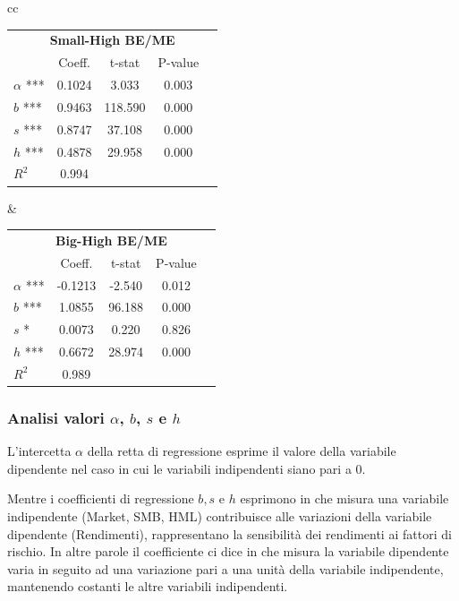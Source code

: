 \begin{center}
\begin{tabular}{cc}
	
	 \begin{tabular}{lcccc}
		\toprule
		
		\multicolumn{5}{c}{\textbf{Small-High BE/ME} }\\
		& Coeff. & t-stat & P-value &\\
		$\alpha$ ***& 	0.1024	& 3.033 & 0.003 &\\
		$b$ ***& 0.9463 & 118.590& 0.000 &\\
		$s$ ***& 0.8747& 37.108 & 0.000 &\\
		$h$ ***&  0.4878& 29.958 & 0.000 & \\
		
		$R^2$ & 0.994 & & & \\
		\hline			
	\end{tabular}
 & \begin{tabular}{lcccc}
	\toprule
	
	\multicolumn{5}{c}{\textbf{Big-High BE/ME} }\\
	& Coeff. & t-stat & P-value &\\
	$\alpha$ *** & 	-0.1213	&-2.540 & 0.012 &\\
	$b$ ***& 1.0855 & 96.188& 0.000 &\\
	$s$ *& 0.0073& 0.220 & 0.826 &\\
	$h$ ***&  0.6672& 28.974 & 0.000 & \\
	
	$R^2$ & 0.989 & & & \\
	\hline	
		
\end{tabular}
\end{tabular}
\label{tab:truthTablesRegr} 
\end{center}
 
\subsubsection{Analisi valori $\alpha$, $b$, $s$ e $h$ }
L'intercetta $\alpha$ della retta di regressione esprime il valore della variabile dipendente nel caso in cui le variabili indipendenti siano pari a 0. 
 
Mentre i coefficienti di regressione $b, s$ e $h$ esprimono in che misura una variabile indipendente (Market, SMB, HML) contribuisce alle variazioni della variabile dipendente (Rendimenti), rappresentano la sensibilità dei rendimenti ai fattori di rischio. In altre parole il coefficiente ci dice in che misura la variabile dipendente varia in seguito ad una variazione pari a una unità della variabile indipendente, mantenendo costanti le altre variabili indipendenti.
 
